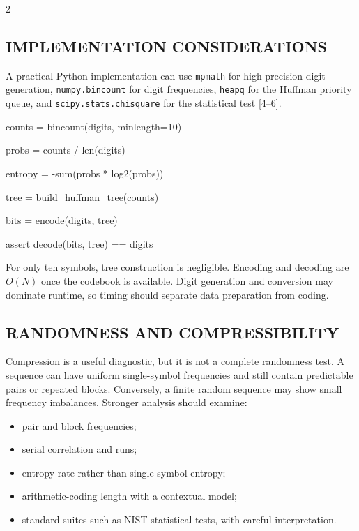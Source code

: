 \begin{multicols}{2}
  \subsection*{\centering\uppercase{Implementation Considerations}}
  {\justifying
  A practical Python implementation can use \texttt{mpmath} for high-precision digit generation, \texttt{numpy.bincount} for digit frequencies, \texttt{heapq} for the Huffman priority queue, and \texttt{scipy.stats.chisquare} for the statistical test [4--6].\par}

  \begin{center}
  \begin{tcolorbox}[
    colback=black!2,
    colframe=IEEEblue!70!black,
    boxrule=0.5pt,
    arc=0mm,
    left=2mm,right=2mm,top=2mm,bottom=2mm
  ]
    \scriptsize\ttfamily\justifying
    counts = bincount(digits, minlength=10)\par
    probs = counts / len(digits)\par
    entropy = -sum(probs * log2(probs))\par
    tree = build\_huffman\_tree(counts)\par
    bits = encode(digits, tree)\par
    assert decode(bits, tree) == digits
  \end{tcolorbox}
  \end{center}

  For only ten symbols, tree construction is negligible. Encoding and decoding are $O(N)$ once the codebook is available. Digit generation and conversion may dominate runtime, so timing should separate data preparation from coding.

  \subsection*{\centering\uppercase{Randomness and Compressibility}}
  Compression is a useful diagnostic, but it is not a complete randomness test. A sequence can have uniform single-symbol frequencies and still contain predictable pairs or repeated blocks. Conversely, a finite random sequence may show small frequency imbalances. Stronger analysis should examine:
  \begin{itemize}\justifying
    \item pair and block frequencies;
    \item serial correlation and runs;
    \item entropy rate rather than single-symbol entropy;
    \item arithmetic-coding length with a contextual model;
    \item standard suites such as NIST statistical tests, with careful interpretation.
  \end{itemize}


\end{multicols}
